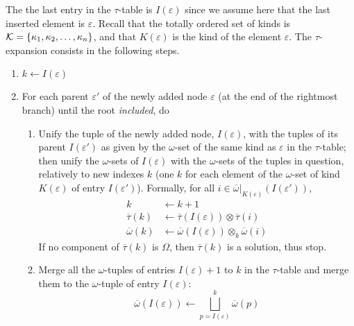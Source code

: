The the last entry in the \(\tau\)-table is \(I(\varepsilon)\) since
we assume here that the last inserted element is
\(\varepsilon\). Recall that the totally ordered set of kinds is
\({\cal K} = \{\kappa_1, \kappa_2, \dots, \kappa_n\}\), and that
\(K(\varepsilon)\) is the kind of the element \(\varepsilon\). The
\(\tau\)-expansion consists in the following steps.
\begin{enumerate}

  \item \(k \leftarrow I(\varepsilon)\)

  \item For each parent \(\varepsilon'\) of the newly added node
    \(\varepsilon\) (at the end of the rightmost branch) until the
    root \emph{included}, do
  \begin{enumerate}

    \item \label{tau_expansion:1} Unify the tuple of the newly added
      node, \(I(\varepsilon)\), with the tuples of its parent
      \(I(\varepsilon')\) as given by the \(\omega\)-set of the same
      kind as \(\varepsilon\) in the \(\tau\)-table; then unify the
      \(\omega\)-sets of \(I(\varepsilon)\) with the \(\omega\)-sets
      of the tuples in question, relatively to new indexes \(k\) (one
      \(k\) for each element of the \(\omega\)-set of kind
      \(K(\varepsilon)\) of entry \(I(\varepsilon')\)). Formally, for
      all \(i \in
      \overline{\omega}|_{K(\varepsilon)}(I(\varepsilon'))\),
    \begin{align*}
      k &\leftarrow k + 1\\
      \overline{\tau}(k) &\leftarrow \overline{\tau}(I(\varepsilon)) \otimes
      \overline{\tau}(i)\\
      \overline{\omega}(k) &\leftarrow \overline{\omega}(I(\varepsilon))
      \otimes_k \overline{\omega}(i)
    \end{align*}
    If no component of \(\overline{\tau}(k)\) is \(\Omega\), then
    \(\overline{\tau}(k)\) is a solution, thus stop.

    \item \label{tau_expansion:2} Merge all the \(\omega\)-tuples of
      entries \(I(\varepsilon)+1\) to \(k\) in the \(\tau\)-table and merge
      them to the \(\omega\)-tuple of entry \(I(\varepsilon)\):
      \[
        \overline{\omega}(I(\varepsilon)) \leftarrow
        \bigsqcup_{p=I(\varepsilon)}^{k}{\overline{\omega}(p)}
      \]

  \end{enumerate}

\end{enumerate}
